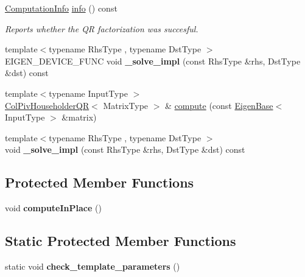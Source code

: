 \begin{DoxyCompactItemize}
\mbox{\hyperlink{group__enums_ga85fad7b87587764e5cf6b513a9e0ee5e}{Computation\+Info}} \mbox{\hyperlink{class_eigen_1_1_col_piv_householder_q_r_a5c756a789175197cab3eff3a3e479ef2}{info}} () const
\begin{DoxyCompactList}\small\item\em Reports whether the QR factorization was succesful. \end{DoxyCompactList}\item 
\mbox{\label{class_eigen_1_1_col_piv_householder_q_r_a22731a654f7568409c6a0d5592a192ba}} 
{\footnotesize template$<$typename Rhs\+Type , typename Dst\+Type $>$ }\\E\+I\+G\+E\+N\+\_\+\+D\+E\+V\+I\+C\+E\+\_\+\+F\+U\+NC void {\bfseries \+\_\+solve\+\_\+impl} (const Rhs\+Type \&rhs, Dst\+Type \&dst) const
\item 
{\footnotesize template$<$typename Input\+Type $>$ }\\\mbox{\hyperlink{class_eigen_1_1_col_piv_householder_q_r}{Col\+Piv\+Householder\+QR}}$<$ Matrix\+Type $>$ \& \mbox{\hyperlink{class_eigen_1_1_col_piv_householder_q_r_a608016776319abe8fe96b85f83c8dd3d}{compute}} (const \mbox{\hyperlink{struct_eigen_1_1_eigen_base}{Eigen\+Base}}$<$ Input\+Type $>$ \&matrix)
\item 
\mbox{\label{class_eigen_1_1_col_piv_householder_q_r_ae6bdb186aa81c7b4fae575c6e055ab47}} 
{\footnotesize template$<$typename Rhs\+Type , typename Dst\+Type $>$ }\\void {\bfseries \+\_\+solve\+\_\+impl} (const Rhs\+Type \&rhs, Dst\+Type \&dst) const
\end{DoxyCompactItemize}
\subsection*{Protected Member Functions}
\begin{DoxyCompactItemize}
\item 
\mbox{\label{class_eigen_1_1_col_piv_householder_q_r_a7bc043db5ef8072bc9be198404123a56}} 
void {\bfseries compute\+In\+Place} ()
\end{DoxyCompactItemize}
\subsection*{Static Protected Member Functions}
\begin{DoxyCompactItemize}
\item 
\mbox{\label{class_eigen_1_1_col_piv_householder_q_r_a5a0113f1df3e804a7798ebaaaa2354ca}} 
static void {\bfseries check\+\_\+template\+\_\+parameters} ()
\end{DoxyCompactItemize}

